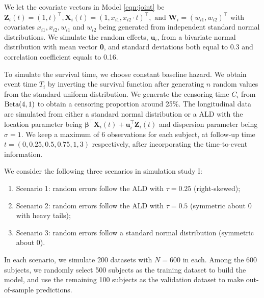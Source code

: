 We let the covariate vectors in Model \eqref{eqn:joint} be ${\boldsymbol Z}_i(t)=(1, t)^{\top}, {\boldsymbol X}_i(t)=(1, x_{i1}, x_{i2}\cdot t)^{\top}, \mbox{ and } {\boldsymbol W}_{i}=(w_{i1}, w_{i2})^{\top}$ with covariates $x_{i1}, x_{i2}, w_{i1}$ and $w_{i2}$ being generated from independent standard normal distributions. We simulate the random effects, $\boldsymbol{u}_i$, from a bivariate normal distribution with mean vector {\bf 0}, and standard deviations both equal to 0.3 and correlation coefficient equals to 0.16.

To simulate the survival time, we choose constant baseline hazard. We obtain event time $T_i$ by inverting the survival function after generating $n$ random values from the standard uniform distribution. We generate the censoring time $C_i$ from $\textnormal{Beta}(4,1)$ to obtain a censoring proportion around 25\%. The longitudinal data are simulated from either a standard normal distribution or a ALD with the location parameter being $\boldsymbol{\beta}^{\top}{\boldsymbol X}_i(t) + {\boldsymbol u}_i^{\top}{\boldsymbol Z}_i(t)$ and dispersion parameter being $\sigma=1$. We keep a maximum of 6 observations for each subject, at follow-up time $t=(0, 0.25, 0.5, 0.75, 1, 3)$ respectively, after incorporating the time-to-event information.

We consider the following three scenarios in simulation study I:
\begin{enumerate}
\item Scenario 1: random errors follow the ALD with $\tau=0.25$ (right-skewed);
\item Scenario 2: random errors follow the ALD with $\tau=0.5$ (symmetric about 0 with heavy tails);
\item Scenario 3: random errors follow a standard normal distribution (symmetric about 0).
\end{enumerate}

In each scenario, we simulate 200 datasets with $N=600$ in each. Among the 600 subjects, we randomly select 500 subjects as the training dataset to build the model, and use the remaining 100 subjects as the validation dataset to make out-of-sample predictions.

